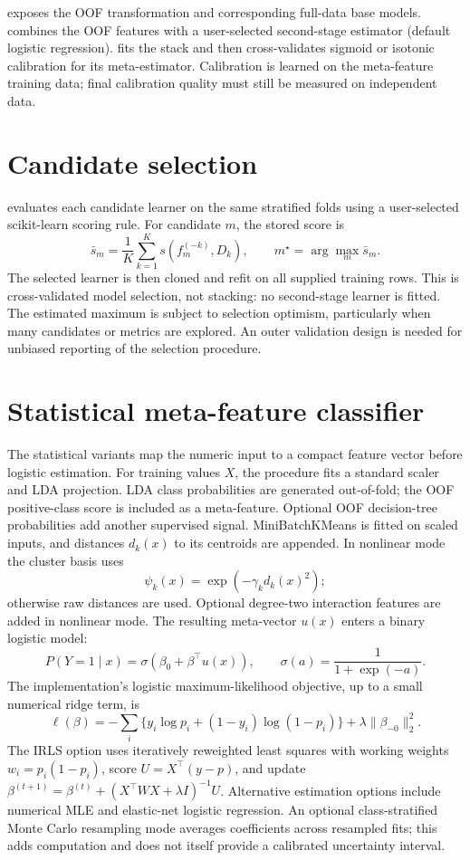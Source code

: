 \documentclass[conference]{IEEEtran}
\begin{document}
 exposes the OOF transformation and corresponding full-data base models.  combines the OOF features with a user-selected second-stage estimator (default logistic regression).  fits the stack and then cross-validates sigmoid or isotonic calibration for its meta-estimator. Calibration is learned on the meta-feature training data; final calibration quality must still be measured on independent data.

\section{Candidate selection}
 evaluates each candidate learner on the same stratified folds using a user-selected scikit-learn scoring rule. For candidate \(m\), the stored score is
\[
\bar s_m=\frac1K\sum_{k=1}^{K}s\left(f_m^{(-k)},D_k\right),
\qquad
m^\star=\arg\max_m \bar s_m.
\]
The selected learner is then cloned and refit on all supplied training rows. This is cross-validated model selection, not stacking: no second-stage learner is fitted. The estimated maximum is subject to selection optimism, particularly when many candidates or metrics are explored. An outer validation design is needed for unbiased reporting of the selection procedure.

\section{Statistical meta-feature classifier}
The statistical variants map the numeric input to a compact feature vector before logistic estimation. For training values \(X\), the procedure fits a standard scaler and LDA projection. LDA class probabilities are generated out-of-fold; the OOF positive-class score is included as a meta-feature. Optional OOF decision-tree probabilities add another supervised signal. MiniBatchKMeans is fitted on scaled inputs, and distances \(d_k(x)\) to its centroids are appended. In nonlinear mode the cluster basis uses
\[
\psi_k(x)=\exp(-\gamma_k d_k(x)^2);
\]
otherwise raw distances are used. Optional degree-two interaction features are added in nonlinear mode. The resulting meta-vector \(u(x)\) enters a binary logistic model:
\[
P(Y=1\mid x)=\sigma(\beta_0+\beta^\top u(x)),
\qquad
\sigma(a)=\frac{1}{1+\exp(-a)}.
\]
The implementation's logistic maximum-likelihood objective, up to a small numerical ridge term, is
\[
\ell(\beta)=-\sum_i\{y_i\log p_i+(1-y_i)\log(1-p_i)\}
+\lambda\|\beta_{-0}\|_2^2.
\]
The IRLS option uses iteratively reweighted least squares with working weights \(w_i=p_i(1-p_i)\), score \(U=X^\top(y-p)\), and update \(\beta^{(t+1)}=\beta^{(t)}+(X^\top W X+\lambda I)^{-1}U\). Alternative estimation options include numerical MLE and elastic-net logistic regression. An optional class-stratified Monte Carlo resampling mode averages coefficients across resampled fits; this adds computation and does not itself provide a calibrated uncertainty interval.
\end{document}
